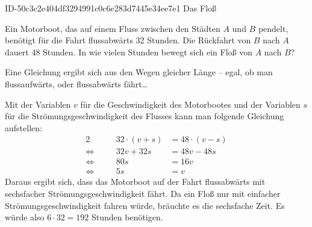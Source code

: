 \begin{exercise}
      {ID-50c3c2e404df3294991c0c6e283d7445e34ee7e1}
      {Das Floß}
  \ifproblem\problem\par
    Ein Motorboot, das auf einem Fluss zwischen den Städten $A$ und $B$ pendelt,
    benötigt für die Fahrt flussabwärts 32 Stunden. Die Rückfahrt von $B$ nach
    $A$ dauert 48 Stunden. In wie vielen Stunden bewegt sich ein Floß von $A$
    nach $B$?
  \fi
  \ifoutline\outline\par
    Eine Gleichung ergibt sich aus den Wegen gleicher Länge -- egal, ob man
    flussaufwärts, oder flussabwärts fährt\ldots
  \fi
  \ifoutcome\outcome\par
    Mit der Variablen $v$ für die Geschwindigkeit des Motorbootes und
    der Variablen $s$ für die Strömungsgeschwindigkeit des Flusses kann
    man folgende Gleichung aufstellen:
    \begin{alignat*}{2}
                     &\quad & 32\cdot(v+s)&=48\cdot(v-s) \\
      \Leftrightarrow&\quad &      32v+32s&=48v-48s      \\
      \Leftrightarrow&\quad &          80s&=16v          \\
      \Leftrightarrow&\quad &           5s&=v
    \end{alignat*}
    Daraus ergibt sich, dass das Motorboot auf der Fahrt flussabwärts mit
    sechsfacher Strömungsgeschwindigkeit fährt. Da ein Floß nur mit
    einfacher Strömungsgeschwindigkeit \glqq fahren\grqq{} würde, bräuchte
    es die sechsfache Zeit. Es würde also $6\cdot32=192$ Stunden benötigen.
  \fi
\end{exercise}
